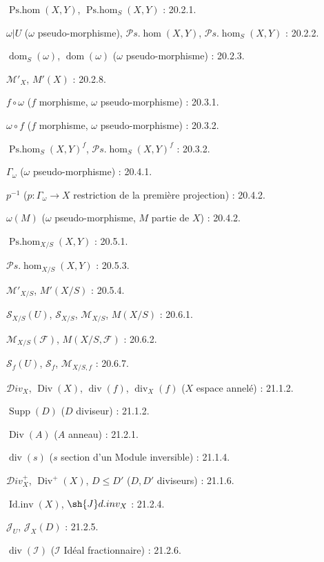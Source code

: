 $\operatorname{Ps.hom}(X,Y)$, $\operatorname{Ps.hom}_S(X,Y)$ : 20.2.1.

$\omega|U$ ($\omega$ pseudo-morphisme),
$\mathcal P\!s.\operatorname{hom}(X,Y)$,
$\mathcal P\!s.\operatorname{hom}_S(X,Y)$ : 20.2.2.

$\operatorname{dom}_S(\omega)$, $\operatorname{dom}(\omega)$
($\omega$ pseudo-morphisme) : 20.2.3.

$\mathcal M'_X$, $M'(X)$ : 20.2.8.

$f\circ\omega$ ($f$ morphisme, $\omega$ pseudo-morphisme) : 20.3.1.

$\omega\circ f$ ($f$ morphisme, $\omega$ pseudo-morphisme) : 20.3.2.

$\operatorname{Ps.hom}_S(X,Y)^f$,
$\mathcal P\!s.\operatorname{hom}_S(X,Y)^f$ : 20.3.2.

$\Gamma_\omega$ ($\omega$ pseudo-morphisme) : 20.4.1.

$p^{-1}$ ($p:\Gamma_\omega\to X$ restriction de la première projection) : 20.4.2.

$\omega(M)$ ($\omega$ pseudo-morphisme, $M$ partie de $X$) : 20.4.2.

$\operatorname{Ps.hom}_{X/S}(X,Y)$ : 20.5.1.

$\mathcal P\!s.\operatorname{hom}_{X/S}(X,Y)$ : 20.5.3.

$\mathcal M'_{X/S}$, $M'(X/S)$ : 20.5.4.

$\mathcal S_{X/S}(U)$, $\mathcal S_{X/S}$, $\mathcal M_{X/S}$,
$M(X/S)$ : 20.6.1.

$\mathcal M_{X/S}(\mathcal F)$, $M(X/S,\mathcal F)$ : 20.6.2.

$\mathcal S_f(U)$, $\mathcal S_f$, $\mathcal M_{X/S,f}$ : 20.6.7.

$\mathcal{D}iv_X$, $\operatorname{Div}(X)$, $\operatorname{div}(f)$,
$\operatorname{div}_X(f)$ ($X$ espace annelé) : 21.1.2.

$\operatorname{Supp}(D)$ ($D$ diviseur) : 21.1.2.

$\operatorname{Div}(A)$ ($A$ anneau) : 21.2.1.

$\operatorname{div}(s)$ ($s$ section d'un Module inversible) : 21.1.4.

$\mathcal{D}iv_X^+$, $\operatorname{Div}^+(X)$, $D\leq D'$
($D,D'$ diviseurs) : 21.1.6.

$\operatorname{Id.inv}(X)$, $\sh{J}d.inv_X$ : 21.2.4.

$\mathcal J_U$, $\mathcal J_X(D)$ : 21.2.5.

$\operatorname{div}(\mathcal I)$ ($\mathcal I$ Idéal fractionnaire) : 21.2.6.

